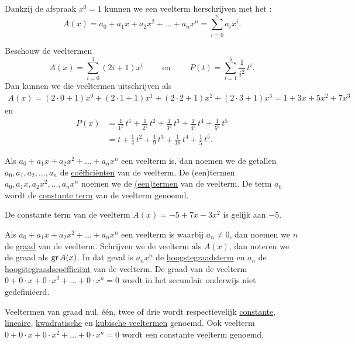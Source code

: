 \documentclass{ximera}
\begin{document}
Dankzij de afspraak $x^0 = 1$ kunnen we een veelterm herschrijven met het :
\[
A(x) = a_0 + a_1x + a_2x^2 + \dots + a_n x^n = \sum_{i=0}^n a_i x^i.
\]

\begin{example}
Beschouw de veeltermen
\[
A(x) = \sum_{i=0}^3 (2i+1) x^i \qquad \text{ en } \qquad P(t) = \sum_{i=1}^5 \frac{1}{i^2} \, t^i.
\] 
Dan kunnen we die veeltermen uitschrijven als
\begin{align*}
A(x)  = (2\cdot0+1)x^0 + (2\cdot1+1)x^1 + (2\cdot2+1)x^2 + (2\cdot3+1)x^3 = 1 + 3x + 5x^2 + 7x^3
\end{align*}
en
\begin{align*}
P(x) 
& = \frac{1}{1^2} \, t^1 + \frac{1}{2^2} \, t^2 + \frac{1}{3^2} \, t^3 + \frac{1}{4^2} \, t^4 + \frac{1}{5^2} \, t^5 \\
& = t + \frac{1}{4}\,t^2 + \frac{1}{9}\,t^3 + \frac{1}{16}\,t^4 + \frac{1}{5}\,t^5.
\end{align*}
\end{example}

Als $a_0 + a_1x + a_2x^2 + \dots + a_n x^n$ een veelterm is, dan noemen we de getallen $a_0, a_1, a_2, \ldots, a_n$ de \underline{co\"effici\"enten} van de veelterm. De (een)termen $a_0, a_1x, a_2x^2, \ldots , a_nx^n$ noemen we de \underline{(een)termen} van de veelterm. De term $a_0$ wordt de \underline{constante term} van de veelterm genoemd.

\begin{example}
De constante term van de veelterm $A(x) = -5 + 7x - 3x^2$ is gelijk aan $-5$.  
\end{example}

Als $a_0 + a_1x + a_2x^2 + \dots + a_n x^n$ een veelterm is waarbij $a_n \neq 0$, dan noemen we $n$ de \underline{graad} van de veelterm. Schrijven we de veelterm als $A(x)$, dan noteren we de graad als $\operatorname{gr} A(x)$. In dat geval is $a_nx^n$ de \underline{hoogstegraadsterm} en $a_n$ de \underline{hoogstegraadsco\"effici\"ent} van de veelterm. De graad van de veelterm $0 + 0\cdot x + 0 \cdot x^2 + \dots + 0\cdot x^n = 0$ wordt in het secundair onderwijs niet gedefini\"eerd.

Veeltermen van graad nul, \'e\'en, twee of drie wordt respectievelijk \underline{constante}, \underline{lineaire}, \linebreak \underline{kwadratische} en \underline{kubische veeltermen} genoemd. Ook veelterm $0 + 0\cdot x + 0 \cdot x^2 + \dots + 0\cdot x^n = 0$ wordt een constante veelterm genoemd.
\end{document}
